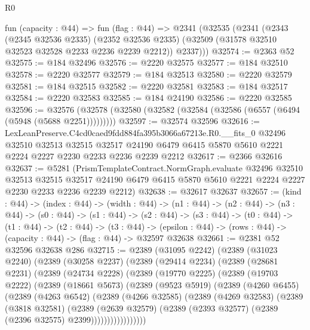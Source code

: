 \begin{lexlean}{R0}
\begin{coremodule}
  fun (capacity : @44) =>
  fun (flag : @44) =>
  @2341
    (@32535
      (@2341
        (@2343
          (@2345 @32536 @2335)
          (@2352 @32536 @2335)
          (@32509 (@31578 @32510 @32523 @32528 @2233 @2236 @2239 @2212))
          @2337)))
@32574 := @2363 @52
@32575 := @184 @32496
@32576 := @2220 @32575
@32577 := @184 @32510
@32578 := @2220 @32577
@32579 := @184 @32513
@32580 := @2220 @32579
@32581 := @184 @32515
@32582 := @2220 @32581
@32583 := @184 @32517
@32584 := @2220 @32583
@32585 := @184 @24190
@32586 := @2220 @32585
@32596 := @32576 (@32578 (@32580 (@32582 (@32584 (@32586 (@6557 (@6494 (@5948 (@5688 @2251)))))))))
@32597 := @32574 @32596
@32616 := LexLeanPreserve.C4cd0caed9fdd884fa395b3066a67213e.R0.__fits_0
    @32496
    @32510
    @32513
    @32515
    @32517
    @24190
    @6479
    @6415
    @5870
    @5610
    @2221
    @2224
    @2227
    @2230
    @2233
    @2236
    @2239
    @2212
@32617 := @2366 @32616
@32637 := @5281
    (PrismTemplateContract.NormGraph.evaluate
      @32496
      @32510
      @32513
      @32515
      @32517
      @24190
      @6479
      @6415
      @5870
      @5610
      @2221
      @2224
      @2227
      @2230
      @2233
      @2236
      @2239
      @2212)
@32638 := @32617 @32637
@32657 := (kind : @44) ->
  (index : @44) ->
  (width : @44) ->
  (n1 : @44) ->
  (n2 : @44) ->
  (n3 : @44) ->
  (s0 : @44) ->
  (s1 : @44) ->
  (s2 : @44) ->
  (s3 : @44) ->
  (t0 : @44) ->
  (t1 : @44) ->
  (t2 : @44) ->
  (t3 : @44) -> (epsilon : @44) -> (rows : @44) -> (capacity : @44) -> (flag : @44) -> @32597 @32638
@32661 := @2381 @52 @32596 @32638 @286
@32715 := @2389
    (@31095 @2242)
    (@2389
      (@31023 @2240)
      (@2389
        (@30258 @2237)
        (@2389
          (@29414 @2234)
          (@2389
            (@28681 @2231)
            (@2389
              (@24734 @2228)
              (@2389
                (@19770 @2225)
                (@2389
                  (@19703 @2222)
                  (@2389
                    (@18661 @5673)
                    (@2389
                      (@9523 @5919)
                      (@2389
                        (@4260 @6455)
                        (@2389
                          (@4263 @6542)
                          (@2389
                            (@4266 @32585)
                            (@2389
                              (@4269 @32583)
                              (@2389
                                (@3818 @32581)
                                (@2389
                                  (@2639 @32579)
                                  (@2389 (@2393 @32577) (@2389 (@2396 @32575) @2399)))))))))))))))))

\end{coremodule}
\end{lexlean}
